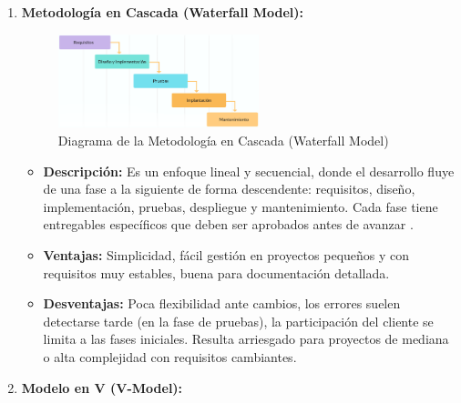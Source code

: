 \begin{enumerate}

    \item \textbf{Metodología en Cascada (Waterfall Model):}

    \begin{figure}[H]
        \begin{center}
            \includegraphics[width = 0.55\textwidth]{Figuras/metodologiaencascada.png}
        \end{center}
        \caption{\label{fig:metodologiaencascada} Diagrama de la Metodología en Cascada (Waterfall Model)}
    \end{figure}
    
    \begin{itemize}
        \item \textbf{Descripción:} Es un enfoque lineal y secuencial, donde el desarrollo fluye de una fase a la siguiente de forma descendente: requisitos, diseño, implementación, pruebas, despliegue y mantenimiento. Cada fase tiene entregables específicos que deben ser aprobados antes de avanzar \cite{studocu2024tradicionales}.
        \item \textbf{Ventajas:} Simplicidad, fácil gestión en proyectos pequeños y con requisitos muy estables, buena para documentación detallada.
        \item \textbf{Desventajas:} Poca flexibilidad ante cambios, los errores suelen detectarse tarde (en la fase de pruebas), la participación del cliente se limita a las fases iniciales. Resulta arriesgado para proyectos de mediana o alta complejidad con requisitos cambiantes.
    \end{itemize}

    \item \textbf{Modelo en V (V-Model):}


\end{enumerate}
